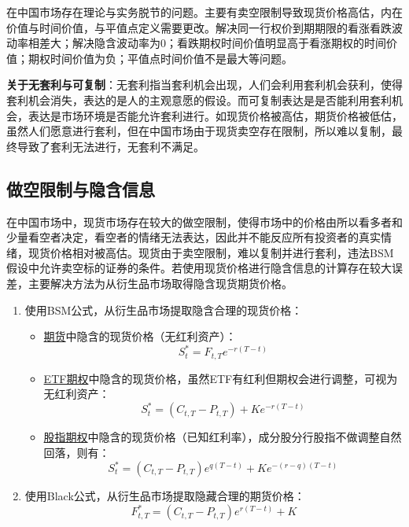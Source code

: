 \documentclass[11pt]{article}
\begin{document}
在中国市场存在理论与实务脱节的问题。主要有卖空限制导致现货价格高估，内在价值与时间价值，与平值点定义需要更改。解决同一行权价到期期限的看涨看跌波动率相差大；解决隐含波动率为0；看跌期权时间价值明显高于看涨期权的时间价值；期权时间价值为负；平值点时间价值不是最大等问题。

\textbf{关于无套利与可复制}：无套利指当套利机会出现，人们会利用套利机会获利，使得套利机会消失，表达的是人的主观意愿的假设。而可复制表达是是否能利用套利机会，表达是市场环境是否能允许套利进行。如现货价格被高估，期货价格被低估，虽然人们愿意进行套利，但在中国市场由于现货卖空存在限制，所以难以复制，最终导致了套利无法进行，无套利不满足。

\subsection{做空限制与隐含信息}

在中国市场中，现货市场存在较大的做空限制，使得市场中的价格由所以看多者和少量看空者决定，看空者的情绪无法表达，因此并不能反应所有投资者的真实情绪，现货价格相对被高估。现货由于卖空限制，难以复制并进行套利，违法BSM假设中允许卖空标的证券的条件。若使用现货价格进行隐含信息的计算存在较大误差，主要解决方法为从衍生品市场取得隐含现货期货价格。
\begin{enumerate}
    \item 使用BSM公式，从衍生品市场提取隐含合理的现货价格：
    \begin{itemize}
        \item \uline{期货}中隐含的现货价格（无红利资产）：
        \begin{equation*}
            S^*_t = F_{t,T} e^{-r(T-t)}
        \end{equation*}
        \item \uline{ETF期权}中隐含的现货价格，虽然ETF有红利但期权会进行调整，可视为无红利资产：
        \begin{equation*}
            S^*_t = \left( C_{t,T} - P_{t,T} \right) + Ke^{-r(T-t)}
        \end{equation*}
        \item \uline{股指期权}中隐含的现货价格（已知红利率），成分股分行股指不做调整自然回落，则有：
        \begin{equation*}
            S^*_t = \left( C_{t,T} - P_{t,T} \right)e^{q(T-t)} + Ke^{-(r-q)(T-t)}
        \end{equation*}
    \end{itemize}
    \item 使用Black公式，从衍生品市场提取隐藏合理的期货价格：
    \begin{equation*}
        F^*_{t,T} = \left(C_{t,T} - P_{t,T}\right) e^{r(T-t)} + K
    \end{equation*}
\end{enumerate}
\end{document}
